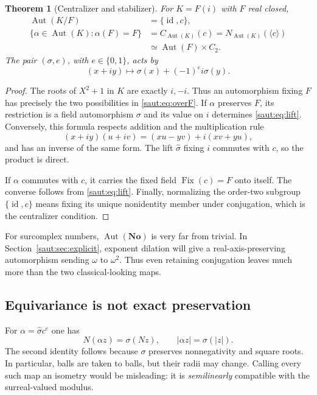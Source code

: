 \documentclass[11pt]{article}
\newtheorem{theorem}{Theorem}[section]
\theoremstyle{definition}
\theoremstyle{remark}
\newcommand{\No}{\mathbf{No}}
\newcommand{\id}{\operatorname{id}}
\newcommand{\Aut}{\operatorname{Aut}}
\newcommand{\Fix}{\operatorname{Fix}}
\newcommand{\angles}[1]{\langle#1\rangle}
\numberwithin{equation}{section}
\begin{document}
\begin{theorem}[Centralizer and stabilizer]\label{saut:thm:axis}
For $K=F(i)$ with $F$ real closed,
\begin{align}
 \Aut(K/F)&=\{\id,c\},\label{saut:eq:overF}\\
 \{\alpha\in\Aut(K):\alpha(F)=F\}
 &=C_{\Aut(K)}(c)=N_{\Aut(K)}(\angles{c})\nonumber\\
 &\simeq\Aut(F)\times C_2.\label{saut:eq:axis}
\end{align}
The pair $(\sigma,e)$, with $e\in\{0,1\}$, acts by
\begin{equation}\label{saut:eq:lift}
 (x+iy)\longmapsto\sigma(x)+(-1)^e i\sigma(y).
\end{equation}
\end{theorem}
\begin{proof}
The roots of $X^2+1$ in $K$ are exactly $i,-i$. Thus an automorphism fixing
$F$ has precisely the two possibilities in \eqref{saut:eq:overF}. If $\alpha$
preserves $F$, its restriction is a field automorphism $\sigma$ and its
value on $i$ determines \eqref{saut:eq:lift}. Conversely, this formula respects
addition and the multiplication rule
\[
 (x+iy)(u+iv)=(xu-yv)+i(xv+yu),
\]
and has an inverse of the same form. The lift $\widehat\sigma$ fixing $i$
commutes with $c$, so the product is direct.

If $\alpha$ commutes with $c$, it carries the fixed field $\Fix(c)=F$ onto
itself. The converse follows from \eqref{saut:eq:lift}. Finally, normalizing the
order-two subgroup $\{\id,c\}$ means fixing its unique nonidentity member
under conjugation, which is the centralizer condition.
\end{proof}

For surcomplex numbers, $\Aut(\No)$ is very far from trivial. In
Section~\ref{saut:sec:explicit}, exponent dilation will give a real-axis-preserving
automorphism sending $\omega$ to $\omega^2$. Thus even retaining conjugation
leaves much more than the two classical-looking maps.

\subsection{Equivariance is not exact preservation}

For $\alpha=\widehat\sigma c^e$ one has
\begin{equation}\label{saut:eq:equivariantnorm}
 N(\alpha z)=\sigma(Nz),\qquad |\alpha z|=\sigma(|z|).
\end{equation}
The second identity follows because $\sigma$ preserves nonnegativity and
square roots. In particular, balls are taken to balls, but their radii may
change. Calling every such map an isometry would be misleading: it is
\emph{semilinearly} compatible with the surreal-valued modulus.
\end{document}
